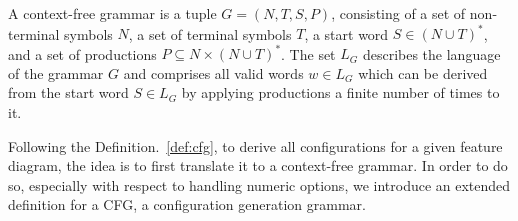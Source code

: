 \begin{definition}\label{def:cfg}
A context-free grammar is a tuple $G = (N, T, S, P)$, consisting of a set of
non-terminal symbols $N$, a set of terminal symbols $T$, a start word $S \in (N
\cup T)^*$, and a set of productions $P \subseteq N \times (N \cup T)^*$. The
set $L_G$ describes the language of the grammar $G$ and comprises all valid
words $w \in L_G$ which can be derived from the start word $S \in L_G$ by
applying productions a finite number of times to it.
\end{definition}

Following the Definition.~\ref{def:cfg}, to derive all configurations for a
given feature diagram, the idea is to first translate it to a context-free
grammar. In order to do so, especially with respect to handling numeric
options, we introduce an extended definition for a CFG, a configuration
generation grammar.

